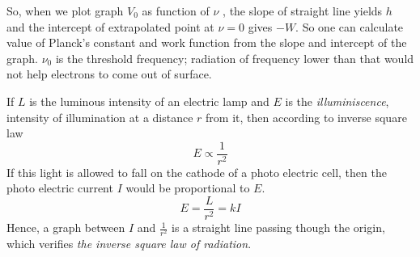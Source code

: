 \documentclass[a4paper,12pt]{article}
\begin{document}
\noindent So, when we plot graph \(V_0\) as function of \( \nu \) , the slope of straight line yields \(h\) and the intercept of extrapolated point at \(\nu = 0\) gives \(-W\).
So one can calculate value of Planck's constant and work function from the slope and intercept of the graph. \(\nu_0\) is the threshold frequency; radiation of frequency
lower than that would not help electrons to come out of surface.

If \(L\) is the luminous intensity of an electric lamp and \(E\) is the \emph{illuminiscence}, intensity of illumination at a distance \(r\) from it, then according 
to inverse square law
\begin{equation}
    \label{inverse}
    E \propto \frac{1}{r^2}
\end{equation}
If this light is allowed to fall on the cathode of a photo electric cell, then the photo electric current \(I\) would be proportional to \(E\).
\[E = \frac{L}{r^2} = kI\] Hence, a graph between \(I\) and \(\frac{1}{r^2}\) is a straight line passing though the origin, which verifies \emph{the inverse square law of radiation}.

\begin{center}
\end{center}
\end{document}
